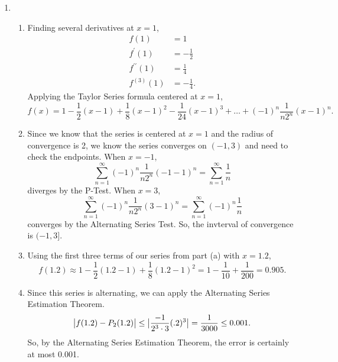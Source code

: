 \begin{enumerate}
	\item \begin{enumerate}
		\item Finding several derivatives at $x=1$,
			\begin{align*}
				f(1) &= 1 \\
				f^\prime(1) &= -\frac{1}{2} \\
				f^{\prime\prime}(1) &= \frac{1}{4} \\
				f^{(3)}(1) &= -\frac{1}{4}.
			\end{align*}
			Applying the Taylor Series formula centered at $x=1$,
			\begin{equation*}
				f(x) = 1 - \frac{1}{2}(x-1) + \frac{1}{8}(x-1)^2 - \frac{1}{24}(x-1)^3 + \ldots + (-1)^n\frac{1}{n2^n}(x-1)^n.
			\end{equation*}
		\item Since we know that the series is centered at $x=1$ and the radius of convergence is 2, we know the series converges on $(-1,3)$ and need to check the endpoints.
			When $x=-1$,
			\begin{equation*}
				\sum_{n=1}^{\infty}{(-1)^n\frac{1}{n2^n}(-1-1)^n} = \sum_{n=1}^{\infty}{\frac{1}{n}}
			\end{equation*}
			diverges by the P-Test.
			When $x=3$,
			\begin{equation*}
				\sum_{n=1}^{\infty}{(-1)^n\frac{1}{n2^n}(3-1)^n} = \sum_{n=1}^{\infty}{(-1)^n\frac{1}{n}}
			\end{equation*}
			converges by the Alternating Series Test.
			So, the invterval of convergence is $(-1,3]$.
		\item Using the first three terms of our series from part (a) with $x=1.2$,
			\begin{equation*}
				f(1.2) \approx 1 - \frac{1}{2}(1.2-1) + \frac{1}{8}(1.2-1)^2 = 1 - \frac{1}{10} + \frac{1}{200} = 0.905.
			\end{equation*}
		\item Since this series is alternating, we can apply the Alternating Series Estimation Theorem.
			\begin{equation*}
				\big\lvert f(1.2)-P_2(1.2) \big\rvert \leq \big\lvert \frac{-1}{2^3\cdot 3} (.2)^3  \big\rvert = \frac{1}{3000} \leq 0.001.
			\end{equation*}
			So, by the Alternating Series Estimation Theorem, the error is certainly at most 0.001.
	\end{enumerate}
\end{enumerate}